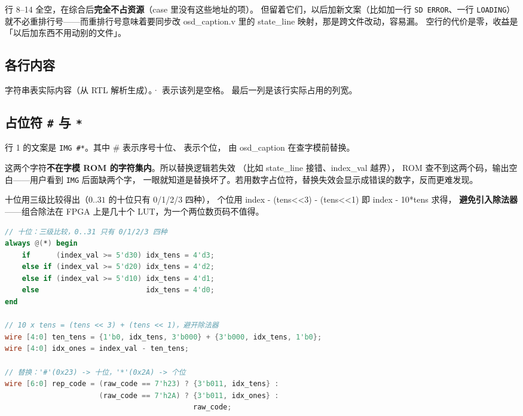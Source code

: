 \documentclass[10pt,a4paper]{article}
\newcommand{\sig}[1]{{\ttfamily\small #1}}
\newcommand{\code}[1]{{\ttfamily\small #1}}
\begin{document}
\begin{dsnote}
行 8--14 全空，在综合后\textbf{完全不占资源}（\code{case} 里没有这些地址的项）。
但留着它们，以后加新文案（比如加一行 \texttt{SD ERROR}、一行 \texttt{LOADING}）
就不必重排行号——而重排行号意味着要同步改 \sig{osd\_caption.v} 里的
\code{state\_line} 映射，那是跨文件改动，容易漏。
空行的代价是零，收益是「以后加东西不用动别的文件」。
\end{dsnote}

\subsection{各行内容}

\begin{table}[htbp]
\centering\small
\caption{字符串表实际内容（从 RTL 解析生成）。\code{·} 表示该列是空格。
最后一列是该行实际占用的列宽。}
\label{tab:strings}
\renewcommand{\arraystretch}{1.3}

\end{table}

\subsection{占位符 \texttt{\#} 与 \texttt{*}}

行 1 的文案是 \texttt{IMG \#*}。其中 \code{\#} 表示序号十位、\code{*} 表示个位，
由 \sig{osd\_caption} 在查字模前替换。

\begin{dsnote}
这两个字符\textbf{不在字模 ROM 的字符集内}。所以替换逻辑若失效
（比如 \code{state\_line} 接错、\code{index\_val} 越界），
ROM 查不到这两个码，输出空白——用户看到 \texttt{IMG} 后面缺两个字，
一眼就知道是替换坏了。若用数字占位符，替换失效会显示成错误的数字，反而更难发现。
\end{dsnote}

十位用三级比较得出（$0..31$ 的十位只有 0/1/2/3 四种），
个位用 \code{index - (tens<<3) - (tens<<1)} 即 \code{index - 10*tens} 求得，
\textbf{避免引入除法器}——组合除法在 FPGA 上是几十个 LUT，为一个两位数页码不值得。

\begin{lstlisting}[language=Verilog,caption={十位与个位求值（\sig{osd\_caption.v}）},label={lst:tens}]
// 十位：三级比较，0..31 只有 0/1/2/3 四种
always @(*) begin
    if      (index_val >= 5'd30) idx_tens = 4'd3;
    else if (index_val >= 5'd20) idx_tens = 4'd2;
    else if (index_val >= 5'd10) idx_tens = 4'd1;
    else                         idx_tens = 4'd0;
end

// 10 x tens = (tens << 3) + (tens << 1)，避开除法器
wire [4:0] ten_tens = {1'b0, idx_tens, 3'b000} + {3'b000, idx_tens, 1'b0};
wire [4:0] idx_ones = index_val - ten_tens;

// 替换：'#'(0x23) -> 十位，'*'(0x2A) -> 个位
wire [6:0] rep_code = (raw_code == 7'h23) ? {3'b011, idx_tens} :
                      (raw_code == 7'h2A) ? {3'b011, idx_ones} :
                                            raw_code;
\end{lstlisting}
\end{document}
